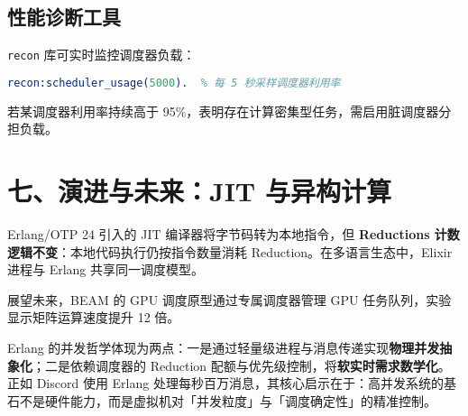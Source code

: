 \section{性能诊断工具}
\verb!recon! 库可实时监控调度器负载：\par
\begin{lstlisting}[language=erlang]
recon:scheduler_usage(5000).  % 每 5 秒采样调度器利用率
\end{lstlisting}
若某调度器利用率持续高于 95\%{}，表明存在计算密集型任务，需启用脏调度器分担负载。\par
\chapter{七、演进与未来：JIT 与异构计算}
Erlang/OTP 24 引入的 JIT 编译器将字节码转为本地指令，但 \textbf{Reductions 计数逻辑不变}：本地代码执行仍按指令数量消耗 Reduction。在多语言生态中，Elixir 进程与 Erlang 共享同一调度模型。\par
展望未来，BEAM 的 GPU 调度原型通过专属调度器管理 GPU 任务队列，实验显示矩阵运算速度提升 12 倍。\par
Erlang 的并发哲学体现为两点：一是通过轻量级进程与消息传递实现\textbf{物理并发抽象化}；二是依赖调度器的 Reduction 配额与优先级控制，将\textbf{软实时需求数学化}。正如 Discord 使用 Erlang 处理每秒百万消息，其核心启示在于：高并发系统的基石不是硬件能力，而是虚拟机对「并发粒度」与「调度确定性」的精准控制。\par
